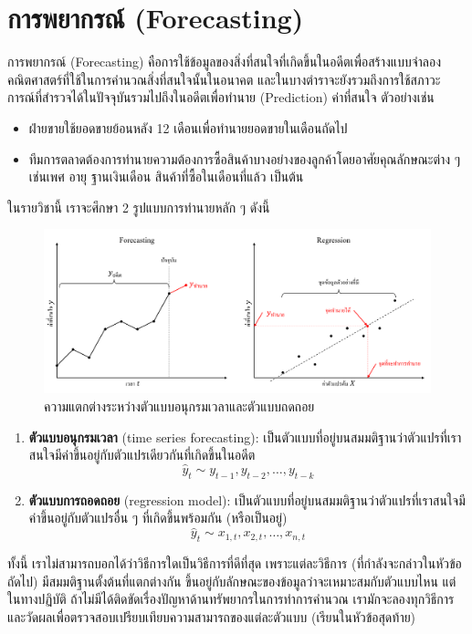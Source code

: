 \chapter{การพยากรณ์ (Forecasting)}

การพยากรณ์ (Forecasting) คือการใช้ข้อมูลของสิ่งที่สนใจที่เกิดขึ้นในอดีตเพื่อสร้างแบบจำลองคณิตศาสตร์ที่ใช้ในการคำนวณสิ่งที่สนใจนั้นในอนาคต และในบางตำราจะยังรวมถึงการใช้สภาวะการณ์ที่สำรวจได้ในปัจจุบันรวมไปถึงในอดีตเพื่อทำนาย (Prediction) ค่าที่สนใจ ตัวอย่างเช่น
\begin{itemize}
    \item ฝ่ายขายใช้ยอดขายย้อนหลัง 12 เดือนเพื่อทำนายยอดขายในเดือนถัดไป
    \item ทีมการตลาดต้องการทำนายความต้องการซื้อสินค้าบางอย่างของลูกค้าโดยอาศัยคุณลักษณะต่าง ๆ เช่นเพศ อายุ ฐานเงินเดือน สินค้าที่ซื้อในเดือนที่แล้ว เป็นต้น
\end{itemize}

ในรายวิชานี้ เราจะศึกษา 2 รูปแบบการทำนายหลัก ๆ ดังนี้
\begin{figure}[h]
    \centering
    \includegraphics[width=1\linewidth]{forecast_and_regression.png}
    \caption{ความแตกต่างระหว่างตัวแบบอนุกรมเวลาและตัวแบบถดถอย}
\end{figure}
\begin{enumerate}
    \item \textbf{ตัวแบบอนุกรมเวลา} (time series forecasting): เป็นตัวแบบที่อยู่บนสมมติฐานว่าตัวแปรที่เราสนใจมีค่าขึ้นอยู่กับตัวแปรเดียวกันที่เกิดขึ้นในอดีต
    \[
        \hat{y}_{t} \sim y_{t-1}, y_{t-2}, \dots, y_{t-k} 
    \]
    \item \textbf{ตัวแบบการถอดถอย} (regression model): เป็นตัวแบบที่อยู่บนสมมติฐานว่าตัวแปรที่เราสนใจมีค่าขึ้นอยู่กับตัวแปรอื่น ๆ ที่เกิดขึ้นพร้อมกัน (หรือเป็นอยู่)
    \[
        \hat{y}_{t} \sim x_{1,t}, x_{2,t}, \dots, x_{n,t} 
    \]
\end{enumerate}

ทั้งนี้ เราไม่สามารถบอกได้ว่าวิธีการใดเป็นวิธีการที่ดีที่สุด เพราะแต่ละวิธีการ (ที่กำลังจะกล่าวในหัวข้อถัดไป) มีสมมติฐานตั้งต้นที่แตกต่างกัน ขึ้นอยู่กับลักษณะของข้อมูลว่าจะเหมาะสมกับตัวแบบไหน แต่ในทางปฏิบัติ ถ้าไม่มีได้ติดขัดเรื่องปัญหาด้านทรัพยากรในการทำการคำนวณ เรามักจะลองทุกวิธีการและวัดผลเพื่อตรวจสอบเปรียบเทียบความสามารถของแต่ละตัวแบบ (เรียนในหัวข้อสุดท้าย)


